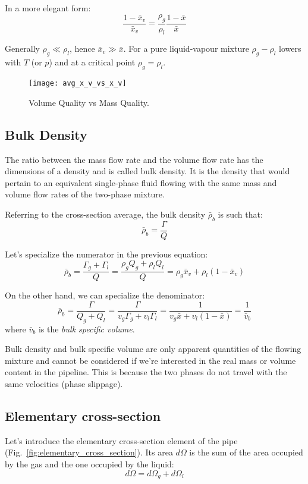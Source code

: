 In a more elegant form:
\begin{equation*}
    \frac{1-\bar{x}_v}{\bar{x}_v} = \frac{\rho_g}{\rho_l}\frac{1-\bar{x}}{\bar{x}}
\end{equation*}

Generally $\rho_g \ll \rho_l$, hence $\bar{x}_v \gg \bar{x}$. For a pure
liquid-vapour mixture $\rho_g-\rho_l$ lowers with $T$ (or $p$) and at a critical
point $\rho_g=\rho_l$.

\begin{figure}[htp]
    \centering
    \texttt{[image: avg\_x\_v\_vs\_x\_v]}
    \caption{Volume Quality vs Mass Quality.}
\end{figure}

\subsection{Bulk Density}
The ratio between the mass flow rate and the volume flow rate has the dimensions
of a density and is called bulk density. It is the density that would pertain to
an equivalent single-phase fluid flowing with the same mass and volume flow
rates of the two-phase mixture.

Referring to the cross-section average, the bulk density $\bar{\rho}_b$ is such
that:
\begin{equation*}
    \bar{\rho}_b = \frac{\Gamma}{Q}
\end{equation*}

Let's specialize the numerator in the previous equation:
\begin{equation*}
    \bar{\rho}_b = \frac{\Gamma_g + \Gamma_l}{Q} = \frac{\rho_g Q_g + \rho_l Q_l}{Q} = \rho_g\bar{x}_v+\rho_l(1-\bar{x}_v)
\end{equation*}

On the other hand, we can specialize the denominator:
\begin{equation*}
    \bar{\rho}_b = \frac{\Gamma}{Q_g+Q_l} = \frac{\Gamma}{v_g\Gamma_g+v_l\Gamma_l} = \frac{1}{v_g\bar{x}+v_l(1-\bar{x})} = \frac{1}{\bar{v}_b}
\end{equation*}
where $\bar{v}_b$ is the \emph{bulk specific volume}.

Bulk density and bulk specific volume are only apparent quantities of the
flowing mixture and cannot be considered if we're interested in the real mass or
volume content in the pipeline. This is because the two phases do not travel
with the same velocities (phase slippage).

\subsection{Elementary cross-section}
Let's introduce the elementary cross-section element of the pipe
(Fig.~\ref{fig:elementary_cross_section}). Its area $d\Omega$ is the sum of the
area occupied by the gas and the one occupied by the liquid:
\begin{equation}
    d\Omega = d\Omega_g + d\Omega_l
    \label{eq:elementary_cross_section}
\end{equation}

